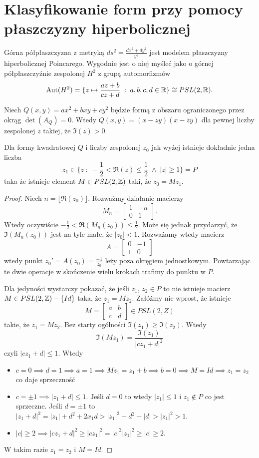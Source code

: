 \documentclass[a4paper, 12pt]{article}
\begin{document}
\section{Klasyfikowanie form przy pomocy płaszczyzny hiperbolicznej}

Górna półpłaszczyzna z metryką $ds^2=\frac{dx^2+dy^2}{y^2}$ jest modelem płaszczyzny hiperbolicznej Poincarego. Wygodnie jest o niej myśleć jako o górnej półpłaszczyźnie zespolonej $H^2$ z grupą automorfizmów
$$\operatorname{Aut}(H^2)=\{z\mapsto \frac{az+b}{cz+d}\;:\;a,b,c,d\in \mathbb{R}\}\cong PSL(2, \mathbb{R}).$$


Niech $Q(x,y)=ax^2+bxy+cy^2$ będzie formą z obszaru ograniczonego przez okrąg $\det(A_Q)=0$. Wtedy $Q(x,y)=(x-zy)(x-\overline{z}y)$ dla pewnej liczby zespolonej $z$ takiej, że $\Im(z)>0$.

\begin{lemma}
  Dla formy kwadratowej $Q$ i liczby zespolonej $z_0$ jak wyżej istnieje dokładnie jedna liczba 
  $$z_1\in \{z\;:\;-\frac{1}{2}< \Re(z)\leq \frac{1}{2}\;\land\;|z|\geq1\}=P$$
  taka że istnieje element $M\in PSL(2, \mathbb{Z})$ taki, że $z_0=Mz_1$.
\end{lemma}

\begin{proof}
  Niech $n=\lfloor\Re(z_0)\rfloor$. Rozważmy działanie macierzy 
  $$M_n=\begin{bmatrix}1&-n\\0&1\end{bmatrix}.$$
  Wtedy oczywiście $-\frac{1}{2}<\Re(M_n(z_0))\leq\frac{1}{2}$. Może się jednak przydarzyć, że $\Im(M_n(z_0))$ jest na tyle małe, że $|z_0|< 1$. Rozważamy wtedy macierz 
  $$A=\begin{bmatrix}0&-1\\1&0\end{bmatrix}$$
  wtedy punkt $z_0'=A(z_0)=\frac{-1}{z_0}$ leży poza okręgiem jednostkowym. Powtarzając te dwie operacje w skończenie wielu krokach trafimy do punktu w $P$.

  Dla jedyności wystarczy pokazać, że jeśli $z_1$, $z_2\in P$ to nie istnieje macierz $M\in PSL(2, \mathbb{Z})-\{Id\}$ taka, że $z_1=Mz_2$. Załóżmy nie wprost, że istnieje
  $$M=\begin{bmatrix}a & b\\c&d\end{bmatrix}\in PSL(2, Z)$$
  takie, że $z_1=Mz_2$. Bez starty ogólności $\Im(z_1)\geq\Im(z_2)$. Wtedy 
  $$\Im(Mz_1)=\frac{\Im(z_1)}{|cz_1+d|^2}$$
  czyli $|cz_1+d|\leq 1$. Wtedy
  \begin{itemize}
    \item $c=0\implies d=1\implies a=1\implies Mz_1=z_1+b\implies b=0\implies M=Id\implies z_1=z_2$ co daje sprzeczność
    \item $c=\pm1\implies |z_1+d|\leq 1$. Jeśli $d=0$ to wtedy $|z_1|\leq 1$ i $z_1\not\in P$ co jest sprzeczne. Jeśli $d=\pm 1$ to $|z_1+d|^2=|z_1|+d^2+2x_1d>|z_1|^2+d^2-|d|>|z_1|^2>1$.
    \item $|c|\geq2\implies |cz_1+d|^2\geq |cz_1|^2=|c|^2|z_1|^2\geq|c|\geq 2$.
  \end{itemize}
  W takim razie $z_1=z_2$ i $M=Id$.
\end{proof}
\end{document}
